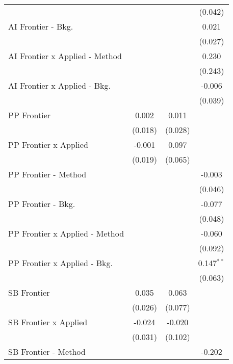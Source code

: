 \begin{tabular}{lccc}
                                  &         &              & (0.042)\\   
   AI Frontier - Bkg.             &         &              & 0.021\\   
                                  &         &              & (0.027)\\   
   AI Frontier x Applied - Method &         &              & 0.230\\   
                                  &         &              & (0.243)\\   
   AI Frontier x Applied - Bkg.   &         &              & -0.006\\   
                                  &         &              & (0.039)\\   
   PP Frontier                    & 0.002   & 0.011        &   \\   
                                  & (0.018) & (0.028)      &   \\   
   PP Frontier x Applied          & -0.001  & 0.097        &   \\   
                                  & (0.019) & (0.065)      &   \\   
   PP Frontier - Method           &         &              & -0.003\\   
                                  &         &              & (0.046)\\   
   PP Frontier - Bkg.             &         &              & -0.077\\   
                                  &         &              & (0.048)\\   
   PP Frontier x Applied - Method &         &              & -0.060\\   
                                  &         &              & (0.092)\\   
   PP Frontier x Applied - Bkg.   &         &              & 0.147$^{**}$\\   
                                  &         &              & (0.063)\\   
   SB Frontier                    & 0.035   & 0.063        &   \\   
                                  & (0.026) & (0.077)      &   \\   
   SB Frontier x Applied          & -0.024  & -0.020       &   \\   
                                  & (0.031) & (0.102)      &   \\   
   SB Frontier - Method           &         &              & -0.202\\   

\end{tabular}
